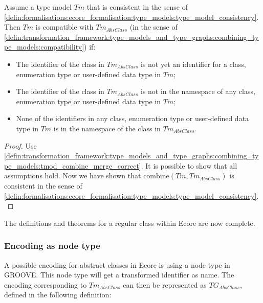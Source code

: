 \begin{thm}
\label{defin:library_of_transformations:type_level_transformations:abstract_classes:tmod_abstract_class_combine_correct}
Assume a type model $Tm$ that is consistent in the sense of \cref{defin:formalisations:ecore_formalisation:type_models:type_model_consistency}. Then $Tm$ is compatible with $Tm_{AbsClass}$ (in the sense of \cref{defin:transformation_framework:type_models_and_type_graphs:combining_type_models:compatibility}) if:
\begin{itemize}
    \item The identifier of the class in $Tm_{AbsClass}$ is not yet an identifier for a class, enumeration type or user-defined data type in $Tm$;
    \item The identifier of the class in $Tm_{AbsClass}$ is not in the namespace of any class, enumeration type or user-defined data type in $Tm$;
    \item None of the identifiers in any class, enumeration type or user-defined data type in $Tm$ is in the namespace of the class in $Tm_{AbsClass}$.
\end{itemize}
\end{thm}

\begin{proof}
Use \cref{defin:transformation_framework:type_models_and_type_graphs:combining_type_models:tmod_combine_merge_correct}. It is possible to show that all assumptions hold. Now we have shown that $\mathrm{combine}(Tm, Tm_{AbsClass})$ is consistent in the sense of \cref{defin:formalisations:ecore_formalisation:type_models:type_model_consistency}.
\end{proof}

The definitions and theorems for a regular class within Ecore are now complete. 

\subsubsection{Encoding as node type}

A possible encoding for abstract classes in Ecore is using a node type in GROOVE. This node type will get a transformed identifier as name. The encoding corresponding to $Tm_{AbsClass}$ can then be represented as $TG_{AbsClass}$, defined in the following definition:


